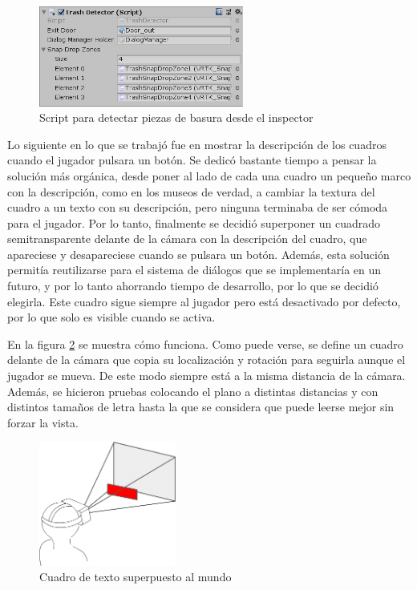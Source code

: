 \begin{figure}[!h]
\begin{center}
\includegraphics[width=0.6\textwidth]{imagenes/7/trash-detector.png}
\caption{Script para detectar piezas de basura desde el inspector}
\label{fig:trash-detector}
\end{center}
\vspace{-0.25cm}
\end{figure}


Lo siguiente en lo que se trabajó fue en mostrar la descripción de los cuadros cuando el jugador pulsara un botón. Se dedicó bastante tiempo a pensar la solución más orgánica, desde poner al lado de cada una cuadro un pequeño marco con la descripción, como en los museos de verdad, a cambiar la textura del cuadro a un texto con su descripción, pero ninguna terminaba de ser cómoda para el jugador. Por lo tanto, finalmente se decidió superponer un cuadrado semitransparente delante de la cámara con la descripción del cuadro, que apareciese y desapareciese cuando se pulsara un botón. Además, esta solución permitía reutilizarse para el sistema de diálogos que se implementaría en un futuro, y por lo tanto ahorrando tiempo de desarrollo, por lo que se decidió elegirla. Este cuadro sigue siempre al jugador pero está desactivado por defecto, por lo que solo es visible cuando se activa.

En la figura \ref{fig:camera-overlay} se muestra cómo funciona. Como puede verse, se define un cuadro delante de la cámara que copia su localización y rotación para seguirla aunque el jugador se mueva. De este modo siempre está a la misma distancia de la cámara. Además, se hicieron pruebas colocando el plano a distintas distancias y con distintos tamaños de letra hasta la que se considera que puede leerse mejor sin forzar la vista.

\begin{figure}[!h]
\begin{center}
\includegraphics[width=0.4\textwidth]{imagenes/7/camera-overlay.png}
\caption{Cuadro de texto superpuesto al mundo}
\label{fig:camera-overlay}
\end{center}
\end{figure}

